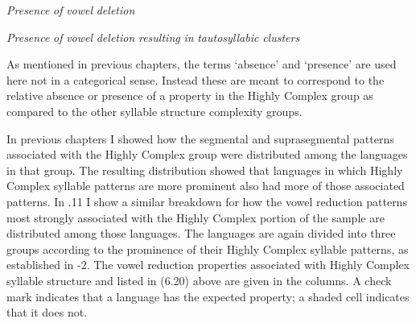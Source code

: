 \textit{Presence} \textit{of} \textit{vowel} \textit{deletion}

\textit{Presence} \textit{of} \textit{vowel} \textit{deletion} \textit{resulting} \textit{in} \textit{tautosyllabic} \textit{clusters}

\z

  As mentioned in previous chapters, the terms ‘absence’ and ‘presence’ are used here not in a categorical sense. Instead these are meant to correspond to the relative absence or presence of a property in the Highly Complex group as compared to the other syllable structure complexity groups.

  In previous chapters I showed how the segmental and suprasegmental patterns associated with the Highly Complex group were distributed among the languages in that group. The resulting distribution showed that languages in which Highly Complex syllable patterns are more prominent also had more of those associated patterns. In .11 I show a similar breakdown for how the vowel reduction patterns most strongly associated with the Highly Complex portion of the sample are distributed among those languages. The languages are again divided into three groups according to the prominence of their Highly Complex syllable patterns, as established in -2. The vowel reduction properties associated with Highly Complex syllable structure and listed in (6.20) above are given in the columns. A check mark indicates that a language has the expected property; a shaded cell indicates that it does not. 

